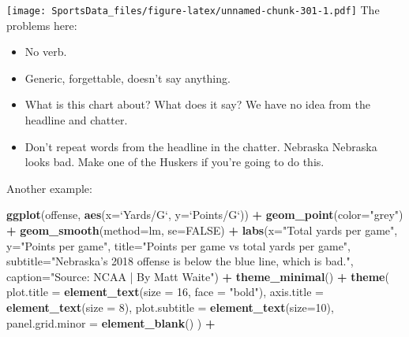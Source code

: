 \documentclass[
]{book}
\newenvironment{Shaded}{\begin{snugshade}}{\end{snugshade}}
\newcommand{\DataTypeTok}[1]{\textcolor[rgb]{0.13,0.29,0.53}{#1}}
\newcommand{\DecValTok}[1]{\textcolor[rgb]{0.00,0.00,0.81}{#1}}
\newcommand{\KeywordTok}[1]{\textcolor[rgb]{0.13,0.29,0.53}{\textbf{#1}}}
\newcommand{\NormalTok}[1]{#1}
\newcommand{\OperatorTok}[1]{\textcolor[rgb]{0.81,0.36,0.00}{\textbf{#1}}}
\newcommand{\OtherTok}[1]{\textcolor[rgb]{0.56,0.35,0.01}{#1}}
\newcommand{\StringTok}[1]{\textcolor[rgb]{0.31,0.60,0.02}{#1}}
\providecommand{\tightlist}{%
  \setlength{\itemsep}{0pt}\setlength{\parskip}{0pt}}
\begin{document}
\texttt{[image: SportsData\_files/figure-latex/unnamed-chunk-301-1.pdf]}
The problems here:

\begin{itemize}
\tightlist
\item
  No verb.
\item
  Generic, forgettable, doesn't say anything.
\item
  What is this chart about? What does it say? We have no idea from the headline and chatter.
\item
  Don't repeat words from the headline in the chatter. Nebraska Nebraska looks bad. Make one of the Huskers if you're going to do this.
\end{itemize}

Another example:

\begin{Shaded}
\begin{Highlighting}[]
\KeywordTok{ggplot}\NormalTok{(offense, }\KeywordTok{aes}\NormalTok{(}\DataTypeTok{x=}\StringTok{`}\DataTypeTok{Yards/G}\StringTok{`}\NormalTok{, }\DataTypeTok{y=}\StringTok{`}\DataTypeTok{Points/G}\StringTok{`}\NormalTok{)) }\OperatorTok{+}\StringTok{ }
\StringTok{  }\KeywordTok{geom_point}\NormalTok{(}\DataTypeTok{color=}\StringTok{"grey"}\NormalTok{) }\OperatorTok{+}\StringTok{ }\KeywordTok{geom_smooth}\NormalTok{(}\DataTypeTok{method=}\NormalTok{lm, }\DataTypeTok{se=}\OtherTok{FALSE}\NormalTok{) }\OperatorTok{+}\StringTok{ }
\StringTok{  }\KeywordTok{labs}\NormalTok{(}\DataTypeTok{x=}\StringTok{"Total yards per game"}\NormalTok{, }\DataTypeTok{y=}\StringTok{"Points per game"}\NormalTok{, }\DataTypeTok{title=}\StringTok{"Points per game vs total yards per game"}\NormalTok{, }\DataTypeTok{subtitle=}\StringTok{"Nebraska's 2018 offense is below the blue line, which is bad."}\NormalTok{, }\DataTypeTok{caption=}\StringTok{"Source: NCAA | By Matt Waite"}\NormalTok{) }\OperatorTok{+}\StringTok{ }
\StringTok{  }\KeywordTok{theme_minimal}\NormalTok{() }\OperatorTok{+}\StringTok{ }
\StringTok{  }\KeywordTok{theme}\NormalTok{(}
    \DataTypeTok{plot.title =} \KeywordTok{element_text}\NormalTok{(}\DataTypeTok{size =} \DecValTok{16}\NormalTok{, }\DataTypeTok{face =} \StringTok{"bold"}\NormalTok{),}
    \DataTypeTok{axis.title =} \KeywordTok{element_text}\NormalTok{(}\DataTypeTok{size =} \DecValTok{8}\NormalTok{), }
    \DataTypeTok{plot.subtitle =} \KeywordTok{element_text}\NormalTok{(}\DataTypeTok{size=}\DecValTok{10}\NormalTok{), }
    \DataTypeTok{panel.grid.minor =} \KeywordTok{element_blank}\NormalTok{()}
\NormalTok{    ) }\OperatorTok{+}

\end{Highlighting}
\end{Shaded}
\end{document}
